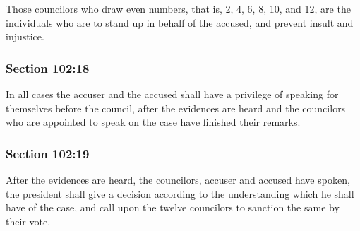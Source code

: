 		Those councilors who draw even numbers, that is, 2, 4, 6, 8, 10, and 12, are the individuals who are to stand up in behalf of the accused, and prevent insult and injustice.


	\subsubsection{Section 102:18} %
		\label{DC102-18}

		In all cases the accuser and the accused shall have a privilege of speaking for themselves before the council, after the evidences are heard and the councilors who are appointed to speak on the case have finished their remarks.


	\subsubsection{Section 102:19} %
		\label{DC102-19}

		After the evidences are heard, the councilors, accuser and accused have spoken, the president shall give a decision according to the understanding which he shall have of the case, and call upon the twelve councilors to sanction the same by their vote.


